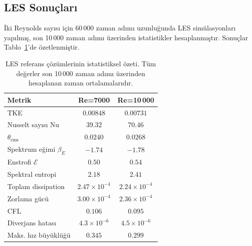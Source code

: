 \subsection{LES Sonuçları}

İki Reynolds sayısı için 60\,000 zaman adımı uzunluğunda LES simülasyonları yapılmış, son 10\,000 zaman adımı üzerinden istatistikler hesaplanmıştır. Sonuçlar Tablo~\ref{tab:les_summary}'de özetlenmiştir.

\begin{table}[H]
\centering
\caption{LES referans çözümlerinin istatistiksel özeti. Tüm değerler son 10\,000 zaman adımı üzerinden hesaplanan zaman ortalamalarıdır.}
\label{tab:les_summary}
\begin{tabular}{lcc}
\toprule
\textbf{Metrik} & \textbf{Re=7000} & \textbf{Re=10\,000} \\
\midrule
TKE                       & $0.00848$ & $0.00731$ \\
Nusselt sayısı $\mathrm{Nu}$       & $39.32$   & $70.46$   \\
$\theta_{\mathrm{rms}}$            & $0.0240$  & $0.0268$  \\
Spektrum eğimi $\beta_{E}$         & $-1.74$   & $-1.78$   \\
Enstrofi $\mathcal{E}$             & $0.50$    & $0.54$    \\
Spektral entropi                   & $2.18$    & $2.41$    \\
Toplam dissipation                 & $2.47\times 10^{-4}$ & $2.24\times 10^{-4}$ \\
Zorlama gücü                       & $3.00\times 10^{-4}$ & $2.36\times 10^{-4}$ \\
CFL                                & $0.106$   & $0.095$   \\
Diverjans hatası                   & $4.3\times 10^{-6}$ & $4.5\times 10^{-6}$ \\
Maks. hız büyüklüğü                & $0.345$   & $0.299$   \\
\bottomrule
\end{tabular}
\end{table}

